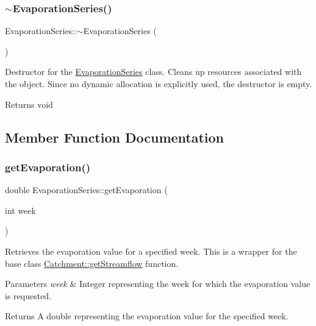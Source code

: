 \subsubsection{\texorpdfstring{$\sim$\+Evaporation\+Series()}{~EvaporationSeries()}}
{\footnotesize\ttfamily Evaporation\+Series\+::$\sim$\+Evaporation\+Series (\begin{DoxyParamCaption}{ }\end{DoxyParamCaption})\hspace{0.3cm}{\ttfamily [override]}}



Destructor for the {\ttfamily \mbox{\hyperlink{classEvaporationSeries}{Evaporation\+Series}}} class. Cleans up resources associated with the object. Since no dynamic allocation is explicitly used, the destructor is empty. 

\begin{DoxyReturn}{Returns}
void 
\end{DoxyReturn}


\subsection{Member Function Documentation}
\mbox{\label{classEvaporationSeries_a4d793fbcb73e8fb6c179968130d6fd0a}} 
\subsubsection{\texorpdfstring{get\+Evaporation()}{getEvaporation()}}
{\footnotesize\ttfamily double Evaporation\+Series\+::get\+Evaporation (\begin{DoxyParamCaption}\item[{int}]{week }\end{DoxyParamCaption})}



Retrieves the evaporation value for a specified week. This is a wrapper for the base class {\ttfamily \mbox{\hyperlink{classCatchment_af4e8206ffab5c901e5e4cdd6136f73a1}{Catchment\+::get\+Streamflow}}} function. 


\begin{DoxyParams}{Parameters}
{\em week} & Integer representing the week for which the evaporation value is requested.\\
\hline
\end{DoxyParams}
\begin{DoxyReturn}{Returns}
A double representing the evaporation value for the specified week. 
\end{DoxyReturn}
\mbox{\label{classEvaporationSeries_ae9f1fc3bb0bf32db12dcc531c6af2e6b}} 

